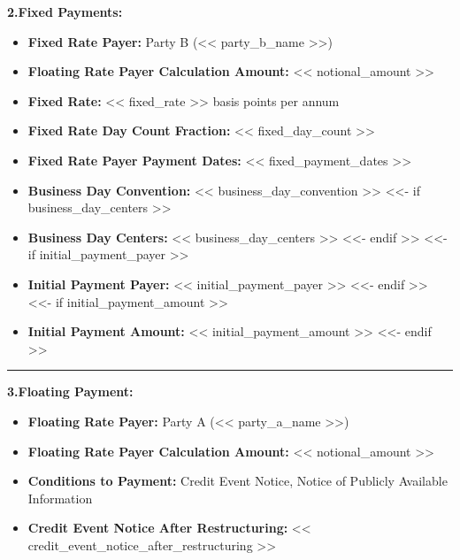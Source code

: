 \documentclass[11pt, a4paper]{article}
\begin{document}

\noindent \textbf{2.\quad Fixed Payments:}
\begin{itemize}[leftmargin=2cm, label={}, itemsep=3pt]
    \item \textbf{Fixed Rate Payer:} Party B (<< party_b_name >>)
    \item \textbf{Floating Rate Payer Calculation Amount:} << notional_amount >>
    \item \textbf{Fixed Rate:} << fixed_rate >> basis points per annum
    \item \textbf{Fixed Rate Day Count Fraction:} << fixed_day_count >>
    \item \textbf{Fixed Rate Payer Payment Dates:} << fixed_payment_dates >>
    \item \textbf{Business Day Convention:} << business_day_convention >>
<<- if business_day_centers >>
    \item \textbf{Business Day Centers:} << business_day_centers >>
<<- endif >>
<<- if initial_payment_payer >>
    \item \textbf{Initial Payment Payer:} << initial_payment_payer >>
<<- endif >>
<<- if initial_payment_amount >>
    \item \textbf{Initial Payment Amount:} << initial_payment_amount >>
<<- endif >>
\end{itemize}

\vspace{0.5cm}
\hrule
\vspace{0.5cm}


\noindent \textbf{3.\quad Floating Payment:}
\begin{itemize}[leftmargin=2cm, label={}, itemsep=3pt]
    \item \textbf{Floating Rate Payer:} Party A (<< party_a_name >>)
    \item \textbf{Floating Rate Payer Calculation Amount:} << notional_amount >>
    \item \textbf{Conditions to Payment:} Credit Event Notice, Notice of Publicly Available Information
    \item \textbf{Credit Event Notice After Restructuring:} << credit_event_notice_after_restructuring >>
\end{itemize}
\end{document}
